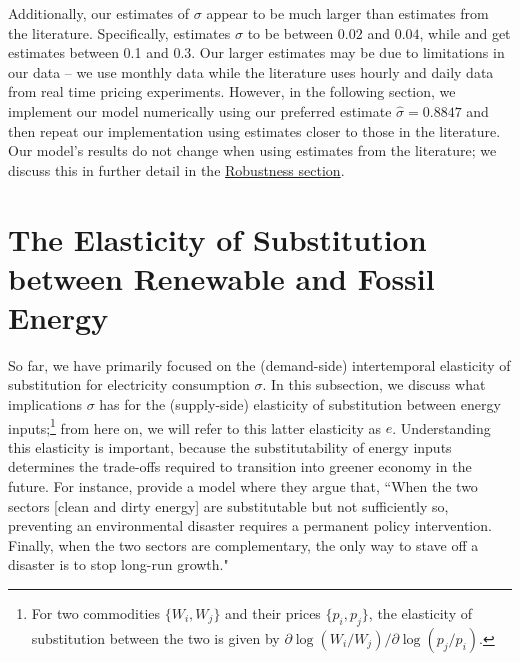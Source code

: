 \documentclass[11pt,a4paper,leqno]{extarticle}
\begin{document}
	Additionally, our estimates of $\sigma$ appear to be much larger than estimates from the literature. Specifically, \citet{Schwarz} estimates $\sigma$ to be between $0.02$ and $0.04$, while \citet{Herriges} and \citet{KS1994} get estimates between 0.1 and 0.3. Our larger estimates may be due to limitations in our data -- we use monthly data while the literature uses hourly and daily data from real time pricing experiments. However, in the following section, we implement our model numerically using our preferred estimate $\hat{\sigma} = 0.8847$ and then repeat our implementation using estimates closer to those in the literature. Our model's results do not change when using estimates from the literature; we discuss this in further detail in the \hyperref[sec:robust]{Robustness section}. 

	
	
	\clearpage
	
	\section{The Elasticity of Substitution between Renewable and Fossil Energy}
	
	So far, we have primarily focused on the (demand-side) intertemporal elasticity of substitution for electricity consumption $\sigma$. In this subsection, we discuss what implications $\sigma$ has for the (supply-side) elasticity of substitution between energy inputs;\footnote{
	For two commodities $\{W_i, W_j\}$ and their prices $\{p_i, p_j\}$, the elasticity of substitution between the two is given by $\partial \log (W_i/ W_j) / \partial \log (p_j/p_i)$. 
	}  from here on, we will refer to this latter elasticity as $e$. Understanding this elasticity is important, because the substitutability of energy inputs determines the trade-offs required to transition into greener economy in the future. For instance, \citet{Ace2012} provide a model where they argue that, ``When the two	sectors [clean and dirty energy] are substitutable but not sufficiently so, preventing an environmental disaster requires a permanent policy intervention. Finally, when the two sectors are complementary, the only way to stave off a disaster is to stop long-run growth."
\end{document}
